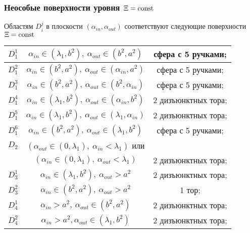 \begin{frame}\frametitle{Неособые поверхности уровня $\Xi=\mathrm{const}$}
\begin{mytheorem} 
Областям $D_i^j$ в плоскости $(\alpha_{in}, \alpha_{out})$ соответствуют следующие поверхности $\Xi = \mathrm{const}$
\medskip
\begin{center}
\begin{tabular}{|c|c|c|}
\hline 
$D_1^1$  	& 	$\alpha_{in} \in (\lambda_1, b^2), \ \alpha_{out} \in (b^2, a^2)$			& сфера с 5 ручками; \\ \hline 
$D_1^2$  	& 	$\alpha_{in} \in (b^2, a^2), \ \alpha_{out} \in (\alpha_{in}, a^2)$				& сфера с 5 ручками; \\ \hline 
$D_1^3$  	& 	$\alpha_{in} \in (b^2, a^2), \ \alpha_{out} \in (b^2, \alpha_{in})$				& сфера с 5 ручками; \\ \hline 
$D_1^4$ 	& 	$\alpha_{in} \in (\lambda_1, b^2), \ \alpha_{out} \in (\alpha_{in}, b^2)$	& 2 дизъюнктных тора; \\ \hline 
$D_1^5$  	& 	$\alpha_{in} \in (\lambda_1, b^2), \ \alpha_{out} \in (\lambda_1, \alpha_{in})$	& 2 дизъюнктных тора; \\ \hline 
$D_1^6$  	& 	$\alpha_{in} \in (b^2, a^2), \ \alpha_{out} \in (\lambda_1, b^2)$			& сфера с 5 ручками; \\ \hline 
\hline
$D_2$  	& 	$(\alpha_{out} \in (0, \lambda_1), \ \alpha_{in} < \lambda_1)$ или & \\
		&  $(\alpha_{in} \in (0, \lambda_1), \ \alpha_{out} < \lambda_1)$				& 2 дизъюнктных тора; \\ \hline
 \hline
$D_3^1$  	& 	$\alpha_{in} \in (\lambda_1, b^2), \ \alpha_{out} > a^2$				& 2 дизъюнктных тора; \\ \hline 
$D_3^2$  	& 	$\alpha_{in} \in (b^2, a^2), \ \alpha_{out} > a^2 $					& 1 тор; \\ \hline 
\hline 
$D_4^1$  	& 	$\alpha_{in} > a^2, \ \alpha_{out} \in (b^2, a^2)$						& 2 дизъюнктных тора; \\ \hline 
$D_4^2$  	& 	$\alpha_{in} > a^2, \alpha_{out} \in (\lambda_1, b^2)$				& 2 дизъюнктных тора; \\ \hline 
\end{tabular}
\end{center}
\label{st:n1_n2_surfaces}
\end{mytheorem} 

\end{frame}

